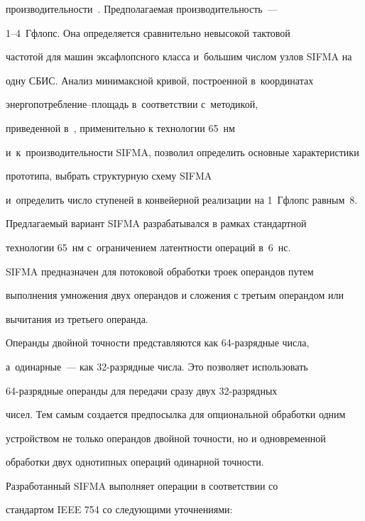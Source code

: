 производительности~\cite{1-st1}. Предполагаемая производительность~---

      1--4~Гфлопс. Она определяется сравнительно невысокой тактовой

частотой для машин эксафлопсного класса и~большим числом узлов SIFMA на

одну СБИС. Анализ минимаксной кривой, построенной в~координатах

      энер\-го\-по\-треб\-ле\-ние--пло\-щадь в~соответствии с~методикой,

приведенной в~\cite{15-st1}, применительно к технологии 65~нм

и~к~производительности SIFMA, позволил определить основные характеристики

прототипа, выбрать структурную схему SIFMA %

и~определить число ступеней в конвейерной реализации на 1~Гфлопс равным~8.

Пред\-ла\-га\-емый вариант SIFMA разрабатывался в рамках стандартной

технологии 65~нм с~ограничением латентности операций в~6~нс.





      SIFMA предназначен для потоковой обработки троек операндов путем

выполнения умножения двух операндов и сложения с третьим операндом или

вычитания из третьего операнда.



      Операнды двойной точности представляются как 64-раз\-ряд\-ные числа,

а~одинарные~--- как 32-раз\-ряд\-ные числа. Это позволяет использовать

      64-раз\-ряд\-ные операнды для передачи сразу двух 32-раз\-ряд\-ных

чисел. Тем самым создается предпосылка для опциональной обработки одним

устройством не только операндов двойной точности, но и одновременной

обработки двух однотипных операций одинарной точности.



      Разработанный SIFMA выполняет операции в соответствии со

стандартом IEEE 754 со следующими уточнениями:


